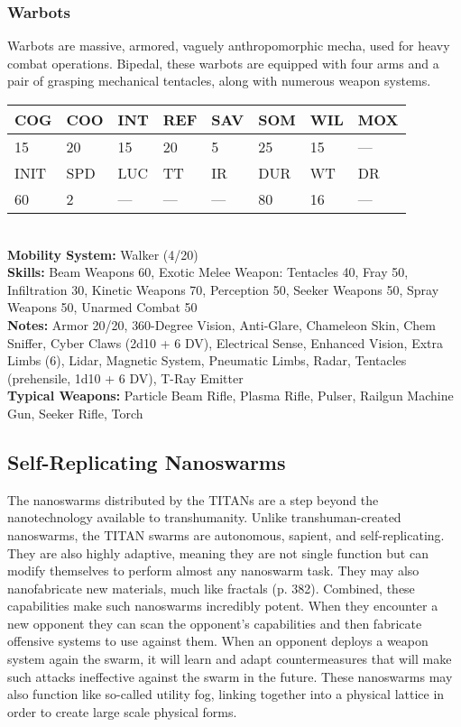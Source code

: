 \subsubsection{Warbots}

Warbots are massive, armored, vaguely anthropomorphic
mecha, used for heavy combat operations.
Bipedal, these warbots are equipped with four arms 
and a pair of grasping mechanical tentacles, along 
with numerous weapon systems.
\\
\begin{tabular}{|l|l|l|l|l|l|l|l|}
\hline
COG & COO & INT & REF & SAV & SOM & WIL & MOX \\
\hline
15 & 20 & 15 & 20 & 5 & 25 & 15 & — \\
\hline
INIT & SPD & LUC & TT & IR & DUR & WT & DR \\
\hline
60 & 2 & — & — & — & 80 & 16 & — \\
\hline
\end{tabular}
\\
\textbf{Mobility System: }Walker (4/20)
\\
\textbf{Skills:} Beam Weapons 60, Exotic Melee Weapon: Tentacles 40, Fray 50, Infiltration 30, Kinetic Weapons 70, Perception 50, Seeker Weapons 50, Spray Weapons 50, Unarmed Combat 50
\\
\textbf{Notes:} Armor 20/20, 360-Degree Vision, Anti-Glare, Chameleon Skin, Chem Sniffer, Cyber Claws (2d10 + 6 DV), Electrical Sense, Enhanced Vision, Extra Limbs (6), Lidar, Magnetic System, Pneumatic Limbs, Radar, Tentacles (prehensile, 1d10 + 6 DV), T-Ray Emitter
\\
\textbf{Typical Weapons:} Particle Beam Rifle, Plasma Rifle, Pulser, Railgun Machine Gun, Seeker Rifle, Torch


\subsection{Self-Replicating Nanoswarms}

The nanoswarms distributed by the TITANs are a step 
beyond the nanotechnology available to transhumanity. 
Unlike transhuman-created nanoswarms, the TITAN 
swarms are autonomous, sapient, and self-replicating. 
They are also highly adaptive, meaning they are not 
single function but can modify themselves to perform 
almost any nanoswarm task. They may also nanofabricate
new materials, much like fractals (p. 382).
Combined, these capabilities make such nanoswarms 
incredibly potent. When they encounter a new opponent
they can scan the opponent's capabilities and
then fabricate offensive systems to use against them. 
When an opponent deploys a weapon system again the 
swarm, it will learn and adapt countermeasures that 
will make such attacks ineffective against the swarm in 
the future. These nanoswarms may also function like 
so-called utility fog, linking together into a physical 
lattice in order to create large scale physical forms.

